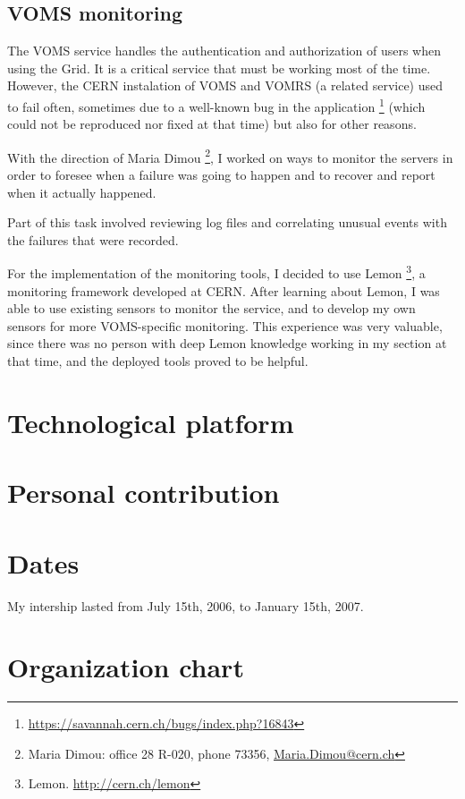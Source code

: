 \documentclass[12pt]{article}
\begin{document}
    \subsection{VOMS monitoring}
    The VOMS service handles the authentication and authorization of users when
    using the Grid.  It is a critical service that must be working most of the
    time.  However, the CERN instalation of VOMS and VOMRS (a related service)
    used to fail often, sometimes due to a well-known bug in the application%
    \footnote{\url{https://savannah.cern.ch/bugs/index.php?16843}}
    (which could not be reproduced nor fixed at that time) but also for other
    reasons.

    With the direction of Maria Dimou%
    \footnote{Maria Dimou: office 28 R-020, phone 73356, \url{Maria.Dimou@cern.ch}},
    I worked on ways to monitor the servers in order to foresee when a failure
    was going to happen and to recover and report when it actually happened.

    Part of this task involved reviewing log files and correlating unusual
    events with the failures that were recorded.

    For the implementation of the monitoring tools, I decided to use Lemon%
    \footnote{Lemon.  \url{http://cern.ch/lemon}},
    a monitoring framework developed at CERN.  After learning about Lemon,
    I was able to use existing sensors to monitor the service, and to develop my
    own sensors for more VOMS-specific monitoring.  This experience was very
    valuable, since there was no person with deep Lemon knowledge working in my
    section at that time, and the deployed tools proved to be helpful.


  \section{Technological platform}
  \section{Personal contribution}
  \section{Dates}
    My intership lasted from July 15th, 2006, to January 15th, 2007.
    


\appendix
  \section{Organization chart}
\end{document}
